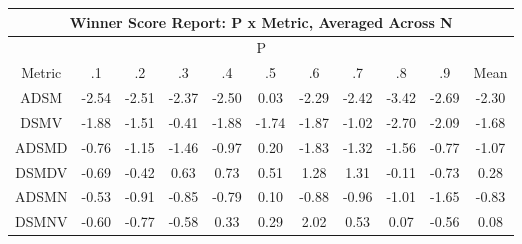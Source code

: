 \begin{longtable}{ | c || c | c | c | c | c | c | c | c | c || c |}
\hline
\multicolumn{11}{|c|}{ Winner Score Report: P x Metric, Averaged Across N } \\
\hline
\multicolumn{11}{|c|}{ P } \\
\hline
Metric & .1 & .2 & .3 & .4 & .5 & .6 & .7 & .8 & .9 & Mean\\
\hline
\hline
\endhead
ADSM &  \cellcolor[HTML]{FFBFBF} -2.54 &  \cellcolor[HTML]{FFBFBF} -2.51 &  \cellcolor[HTML]{FFC7C7} -2.37 &  \cellcolor[HTML]{FFBFBF} -2.50 &  \cellcolor[HTML]{FFFFFF} 0.03 &  \cellcolor[HTML]{FFC7C7} -2.29 &  \cellcolor[HTML]{FFBFBF} -2.42 &  \cellcolor[HTML]{FFA7A7} -3.42 &  \cellcolor[HTML]{FFBFBF} -2.69 &  \cellcolor[HTML]{FFC7C7} -2.30 \\
DSMV &  \cellcolor[HTML]{FFCFCF} -1.88 &  \cellcolor[HTML]{FFD7D7} -1.51 &  \cellcolor[HTML]{FFF7F7} -0.41 &  \cellcolor[HTML]{FFCFCF} -1.88 &  \cellcolor[HTML]{FFD7D7} -1.74 &  \cellcolor[HTML]{FFCFCF} -1.87 &  \cellcolor[HTML]{FFE7E7} -1.02 &  \cellcolor[HTML]{FFB7B7} -2.70 &  \cellcolor[HTML]{FFC7C7} -2.09 &  \cellcolor[HTML]{FFD7D7} -1.68 \\
ADSMD &  \cellcolor[HTML]{FFEFEF} -0.76 &  \cellcolor[HTML]{FFDFDF} -1.15 &  \cellcolor[HTML]{FFD7D7} -1.46 &  \cellcolor[HTML]{FFE7E7} -0.97 &  \cellcolor[HTML]{F7F7FF} 0.20 &  \cellcolor[HTML]{FFCFCF} -1.83 &  \cellcolor[HTML]{FFDFDF} -1.32 &  \cellcolor[HTML]{FFD7D7} -1.56 &  \cellcolor[HTML]{FFEFEF} -0.77 &  \cellcolor[HTML]{FFE7E7} -1.07 \\
DSMDV &  \cellcolor[HTML]{FFEFEF} -0.69 &  \cellcolor[HTML]{FFF7F7} -0.42 &  \cellcolor[HTML]{EFEFFF} 0.63 &  \cellcolor[HTML]{EFEFFF} 0.73 &  \cellcolor[HTML]{EFEFFF} 0.51 &  \cellcolor[HTML]{DFDFFF} 1.28 &  \cellcolor[HTML]{DFDFFF} 1.31 &  \cellcolor[HTML]{FFFFFF} -0.11 &  \cellcolor[HTML]{FFEFEF} -0.73 &  \cellcolor[HTML]{F7F7FF} 0.28 \\
ADSMN &  \cellcolor[HTML]{FFEFEF} -0.53 &  \cellcolor[HTML]{FFE7E7} -0.91 &  \cellcolor[HTML]{FFE7E7} -0.85 &  \cellcolor[HTML]{FFEFEF} -0.79 &  \cellcolor[HTML]{FFFFFF} 0.10 &  \cellcolor[HTML]{FFE7E7} -0.88 &  \cellcolor[HTML]{FFE7E7} -0.96 &  \cellcolor[HTML]{FFE7E7} -1.01 &  \cellcolor[HTML]{FFD7D7} -1.65 &  \cellcolor[HTML]{FFE7E7} -0.83 \\
DSMNV &  \cellcolor[HTML]{FFEFEF} -0.60 &  \cellcolor[HTML]{FFEFEF} -0.77 &  \cellcolor[HTML]{FFEFEF} -0.58 &  \cellcolor[HTML]{F7F7FF} 0.33 &  \cellcolor[HTML]{F7F7FF} 0.29 &  \cellcolor[HTML]{CFCFFF} 2.02 &  \cellcolor[HTML]{EFEFFF} 0.53 &  \cellcolor[HTML]{FFFFFF} 0.07 &  \cellcolor[HTML]{FFEFEF} -0.56 &  \cellcolor[HTML]{FFFFFF} 0.08 \\

\end{longtable}
